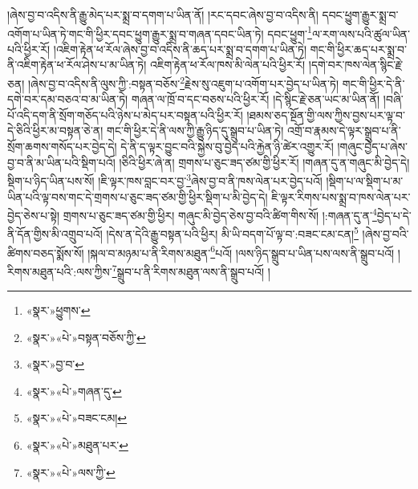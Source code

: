 །ཞེས་བྱ་བ་འདིས་ནི་རྒྱུ་མེད་པར་སྨྲ་བ་དགག་པ་ཡིན་ནོ། །རང་དབང་ཞེས་བྱ་བ་འདིས་ནི། དབང་ཕྱུག་རྒྱུར་སྨྲ་བ་འགོག་པ་ཡིན་ཏེ་གང་གི་ཕྱིར་དབང་ཕྱུག་རྒྱུར་སྨྲ་བ་གཞན་དབང་ཡིན་ཏེ། དབང་ཕྱུག་\footnote{«སྣར་»ཕྱུགས་}ལ་རག་ལས་པའི་ཚུལ་ཡིན་པའི་ཕྱིར་རོ། །འཇིག་རྟེན་ཕ་རོལ་ཞེས་བྱ་བ་འདིས་ནི་ཆད་པར་སྨྲ་བ་དགག་པ་ཡིན་ཏེ། གང་གི་ཕྱིར་ཆད་པར་སྨྲ་བ་ནི་འཇིག་རྟེན་ཕ་རོལ་ཤེས་པ་མ་ཡིན་ཏེ། འཇིག་རྟེན་ཕ་རོལ་ཁས་མི་ལེན་པའི་ཕྱིར་རོ། །དགེ་བར་ཁས་ལེན་སྙིང་རྗེ་ཅན། །ཞེས་བྱ་བ་འདིས་ནི་ལུས་ཀྱི་:བསྟན་བཅོས་\footnote{«སྣར་»«པེ་»བསྟན་བཅོས་ཀྱི་}རྗེས་སུ་འཇུག་པ་འགོག་པར་བྱེད་པ་ཡིན་ཏེ། གང་གི་ཕྱིར་དེ་ནི་དགེ་བར་དམ་བཅའ་བ་མ་ཡིན་ཏེ། གཞན་ལ་ཁྲོ་བ་དང་བཅས་པའི་ཕྱིར་རོ། །དེ་སྙིང་རྗེ་ཅན་ཡང་མ་ཡིན་ནོ། །བཞི་པོ་འདི་དག་ནི་སྲོག་གཅོད་པའི་ཉེས་པ་མེད་པར་བསྟན་པའི་ཕྱིར་རོ། །ཐམས་ཅད་སྔོན་གྱི་ལས་ཀྱིས་བྱས་པར་ལྟ་བ་དེ་ཅིའི་ཕྱིར་མ་བསྟན་ཅེ་ན། གང་གི་ཕྱིར་དེ་ནི་ལས་ཀྱི་རྒྱུ་ཉིད་དུ་སྒྲུབ་པ་ཡིན་ཏེ། འགྲོ་བ་རྣམས་དེ་ལྟར་སྒྲུབ་པ་ནི་སྲོག་ཆགས་གསོད་པར་བྱེད་དེ། དེ་ནི་ད་ལྟར་བྱུང་བའི་སྐྱེས་བུ་བྱེད་པའི་རྐྱེན་ཉི་ཚེར་འགྱུར་རོ། །གཞུང་བྱེད་པ་ཞེས་བྱ་བ་ནི་མ་ཡིན་པའི་སྡིག་པའོ། །ཅིའི་ཕྱིར་ཞེ་ན། གྲགས་པ་ཅུང་ཟད་ཙམ་གྱི་ཕྱིར་རོ། །གཞན་དུ་ན་གཞུང་མི་བྱེད་དེ། སྡིག་པ་ཉིད་ཡིན་པས་སོ། །ཇི་ལྟར་ཁས་བླང་བར་བྱ་\footnote{«སྣར་»བྱ་བ་}ཞེས་བྱ་བ་ནི་ཁས་ལེན་པར་བྱེད་པའོ། །སྡིག་པ་ལ་སྡིག་པ་མ་ཡིན་པའི་ལྟ་བས་གང་དེ་གྲགས་པ་ཅུང་ཟད་ཙམ་གྱི་ཕྱིར་སྡིག་པ་མི་བྱེད་དེ། ཇི་ལྟར་རིགས་པས་སྨྲ་བ་ཁས་ལེན་པར་བྱེད་ཅེས་པ་སྟེ། གྲགས་པ་ཅུང་ཟད་ཙམ་གྱི་ཕྱིར། གཞུང་མི་བྱེད་ཅེས་བྱ་བའི་ཚིག་གིས་སོ། །:གཞན་དུ་ན་\footnote{«སྣར་»«པེ་»གཞན་དུ་}བྱེད་པ་དེ་ནི་དོན་གྱིས་མི་འགྲུབ་པའོ། །དེས་ན་དེའི་རྒྱུ་བསྟན་པའི་ཕྱིར། མི་ཡི་བདག་པོ་ལྟ་བ་:བཟང་ངམ་ངན།\footnote{«སྣར་»«པེ་»བཟང་ངམ།} །ཞེས་བྱ་བའི་ཚིགས་བཅད་སྨོས་སོ། །སྐལ་བ་མཉམ་པ་ནི་རིགས་མཐུན་\footnote{«སྣར་»«པེ་»མཐུན་པར་}པའོ། །ལས་ཉིད་སྒྲུབ་པ་ཡིན་པས་ལས་ནི་སྒྲུབ་པའོ། །རིགས་མཐུན་པའི་:ལས་ཀྱིས་\footnote{«སྣར་»«པེ་»ལས་ཀྱི་}སྒྲུབ་པ་ནི་རིགས་མཐུན་ལས་ནི་སྒྲུབ་པའོ། །
